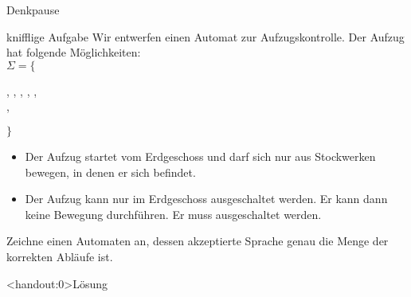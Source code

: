 {
\begin{frame}{Denkpause}
\begin{small}
    \begin{alertblock}{knifflige Aufgabe}
    Wir entwerfen einen Automat zur Aufzugskontrolle.
    Der Aufzug hat folgende Möglichkeiten:\\
    $\Sigma =\{$\begin{footnotesize}
     ,  ,  ,  ,  , \\\qquad\quad\; , 
    \end{footnotesize}$\}$
    \begin{itemize}
        \item Der Aufzug startet vom Erdgeschoss und darf sich nur aus Stockwerken bewegen, in denen er sich befindet.
        \item Der Aufzug kann nur im Erdgeschoss ausgeschaltet werden. Er kann dann keine Bewegung durchführen. Er muss ausgeschaltet werden.
    \end{itemize}
    \end{alertblock}
    \alert{Zeichne einen Automaten an, dessen akzeptierte Sprache genau die Menge der korrekten Abläufe ist.}
    \end{small}
\end{frame}

\begin{frame}<handout:0>{Lösung}
\begin{center}
\end{center}
\end{frame}
}

